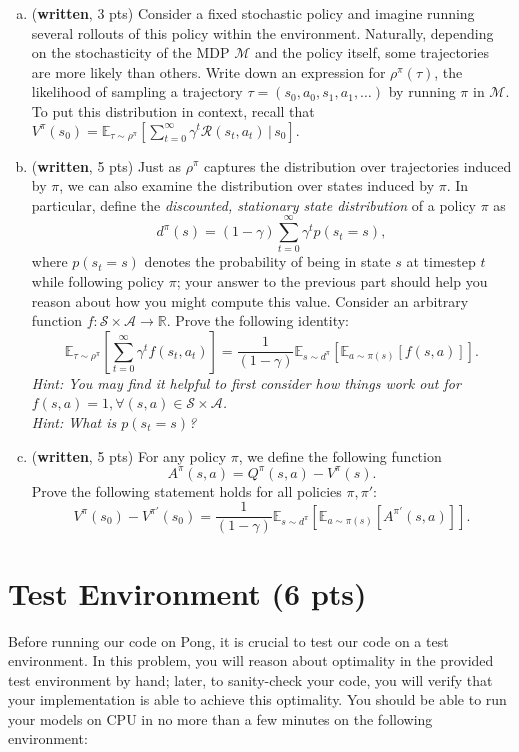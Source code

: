 \documentclass{article}
\newif\ifanswers
\newcommand{\ifans}[1]{\ifanswers \color{red} \textbf{Solution: } #1 \color{black} \else {} \fi}
\begin{document}
\begin{enumerate}[(a)]
	\item (\textbf{written}, 3 pts) Consider a fixed stochastic policy and imagine running several rollouts of this policy within the environment. Naturally, depending on the stochasticity of the MDP $\mathcal{M}$ and the policy itself, some trajectories are more likely than others. Write down an expression for $\rho^\pi(\tau)$, the likelihood of sampling a trajectory $\tau = (s_0,a_0,s_1,a_1,\ldots)$ by running $\pi$ in $\mathcal{M}$. To put this distribution in context, recall that $V^\pi(s_0) = \mathbb{E}_{\tau \sim \rho^\pi}\left[\sum\limits_{t=0}^\infty \gamma^t \mathcal{R}(s_t,a_t) \,|\, s_0\right].$
	
	\ifans{
	}
	
	\item (\textbf{written}, 5 pts) Just as $\rho^\pi$ captures the distribution over trajectories induced by $\pi$, we can also examine the distribution over states induced by $\pi$. In particular, define the \textit{discounted, stationary state distribution} of a policy $\pi$ as $$d^\pi(s) = (1-\gamma) \sum\limits_{t=0}^\infty \gamma^t p(s_t = s),$$ where $p(s_t = s)$ denotes the probability of being in state $s$ at timestep $t$ while following policy $\pi$; your answer to the previous part should help you reason about how you might compute this value. Consider an arbitrary function $f: \mathcal{S} \times \mathcal{A} \rightarrow \mathbb{R}$. Prove the following identity: $$\mathbb{E}_{\tau \sim \rho^\pi}\left[\sum\limits_{t=0}^\infty \gamma^t f(s_t,a_t)\right] = \frac{1}{(1-\gamma)} \mathbb{E}_{s \sim d^\pi}\left[\mathbb{E}_{a \sim \pi(s)}\left[f(s,a)\right]\right] .$$ 
	\emph{Hint: You may find it helpful to first consider how things work out for $f(s,a) = 1, \forall (s,a) \in \mathcal{S} \times \mathcal{A}$.}\\
	\emph{Hint: What is $p(s_t=s)$?}
	
	\ifans{
	}
	
	\item (\textbf{written}, 5 pts) For any policy $\pi$, we define the following function $$A^\pi(s,a) = Q^\pi(s,a) - V^\pi(s).$$ Prove the following statement holds for all policies $\pi,\pi'$: $$V^\pi(s_0) - V^{\pi'}(s_0) = \frac{1}{(1-\gamma)} \mathbb{E}_{s \sim d^\pi}\left[\mathbb{E}_{a \sim \pi(s)}\left[A^{\pi'}(s,a)\right]\right].$$
	
	\ifans{
	}
\end{enumerate}

\section{Test Environment (6 pts)}
Before running our code on Pong, it is crucial to test our code on a test environment. In this problem, you will reason about optimality in the provided test environment by hand; later, to sanity-check your code, you will verify that your implementation is able to achieve this optimality. You should be able to run your models on CPU in no more than a few minutes on the following environment:
\end{document}

